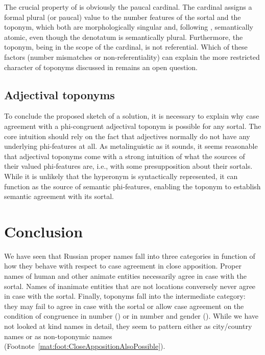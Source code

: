 \documentclass[output=paper,colorlinks,citecolor=brown]{langscibook}
\begin{document}
The crucial property of  is obviously the paucal cardinal. The cardinal assigns a formal plural (or paucal) value to the number features of the sortal and the toponym, which both are morphologically singular and, following \citet{IoninMatushansky2006,IoninMatushansky2018}, semantically atomic, even though the denotatum is semantically plural. Furthermore, the toponym, being in the scope of the cardinal, is not referential. Which of these factors (number mismatches or non-referentiality) can explain the more restricted character of toponyms discussed in  remains an open question.

\subsection{Adjectival toponyms}\label{mat:sec:Adjectival-toponyms}

To conclude the proposed sketch of a solution, it is necessary to explain why case agreement with a phi-congruent adjectival toponym is possible for any sortal. The core intuition should rely on the fact that adjectives normally do not have any underlying phi-features at all. As metalinguistic as it sounds, it seems reasonable that adjectival toponyms come with a strong intuition of what the sources of their valued phi-features are, i.e., with some presupposition about their sortals. While it is unlikely that the hyperonym is syntactically represented, it can function as the source of semantic phi-features, enabling the toponym to establish semantic agreement with its sortal.

\section{Conclusion}\label{mat:sec:Conclusion}

We have seen that Russian proper names fall into three categories in function of how they behave with respect to case agreement in close apposition. Proper names of human and other animate entities necessarily agree in case with the sortal. Names of inanimate entities that are not locations conversely never agree in case with the sortal. Finally, toponyms fall into the intermediate category: they may fail to agree in case with the sortal or allow case agreement on the condition of congruence in number () or in number and gender (). While we have not looked at kind names in detail, they seem to pattern either as city/country names or as non-toponymic names (Footnote~\ref{mat:foot:CloseAppositionAlsoPossible}).
\end{document}
